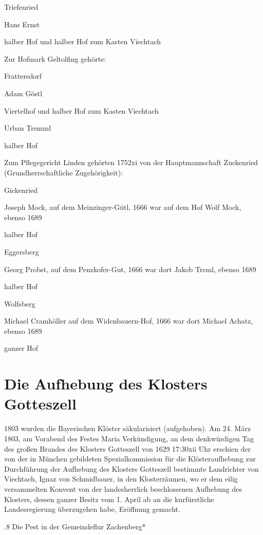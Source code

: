 \documentclass{book}
\begin{document}
Triefenried

Hans Ernst

halber Hof und halber Hof zum Kasten Viechtach



Zur Hofmark Geltolfing gehörte:



Frattersdorf

Adam Göstl

Viertelhof und halber Hof zum Kasten Viechtach



Urban Tremml

halber Hof



Zum Pflegegericht Linden gehörten 1752xi von der Hauptmannschaft Zuckenried
(Grundherrschaftliche Zugehörigkeit):



Gickenried

Joseph Mock, auf dem Meinzinger-Gütl, 1666 war auf dem Hof Wolf Mock, ebenso
1689

halber Hof

Eggersberg

Georg Probst, auf dem Penzkofer-Gut, 1666 war dort Jakob Treml, ebenso 1689

halber Hof

Wolfsberg

Michael Cramhöller auf dem Widenbauern-Hof, 1666 war dort Michael Achatz, ebenso
1689

ganzer Hof

\section{Die Aufhebung des Klosters Gotteszell}

1803 wurden die Bayerischen Klöster säkularisiert (aufgehoben). Am 24. März
1803, am Vorabend des Festes Maria Verkündigung, an dem denkwürdigen Tag des
großen Brandes des Klosters Gotteszell von 1629 17:30xii Uhr erschien der von
der in München gebildeten Spezialkommission für die Klösteraufhebung zur
Durchführung der Aufhebung des Klosters Gotteszell bestimmte Landrichter von
Viechtach, Ignaz von Schmidbauer, in den Klosterräumen, wo er dem eilig
versammelten Konvent von der landesherrlich beschlossenen Aufhebung des
Klosters, dessen ganzer Besitz vom 1. April ab an die kurfürstliche
Landesregierung überzugehen habe, Eröffnung gemacht.

.8 Die Pest in der Gemeindeflur Zachenberg*
\end{document}
